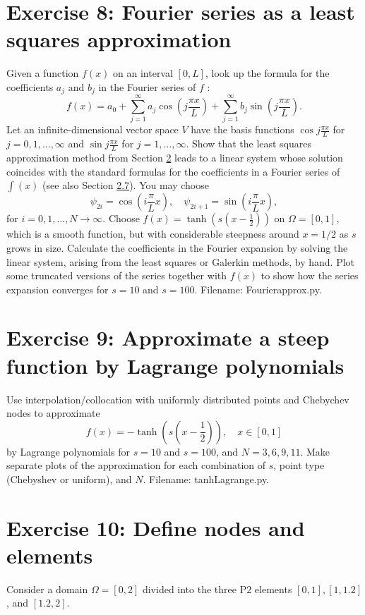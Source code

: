 \documentclass[../main.tex]{subfiles}
\begin{document}
	\section*{Exercise 8: Fourier series as a least squares approximation}
	\label{sec:sec_10_8}
	\noindent Given a function $f(x)$ on an interval $[0, L]$, look up the formula for the coefficients $a_{j}$ and $b_{j}$ in the Fourier series of $f$ :
	$$
	f(x)=a_{0}+\sum_{j=1}^{\infty} a_{j} \cos \left(j \frac{\pi x}{L}\right)+\sum_{j=1}^{\infty} b_{j} \sin \left(j \frac{\pi x}{L}\right).
	$$
	Let an infinite-dimensional vector space $V$ have the basis functions $\cos j \frac{\pi x}{L}$ for $j=0,1, \ldots, \infty$ and $\sin j \frac{\pi x}{L}$ for $j=1, \ldots, \infty$. Show that the least squares approximation method from Section \hyperref[chap:chap_2]{2} leads to a linear system whose solution coincides with the standard formulas for the coefficients in a Fourier series of $\int(x)$ (see also Section \hyperref[sec:sec_2_7]{2.7}). You may choose
	$$
	\psi_{2 i}=\cos \left(i \frac{\pi}{L} x\right), \quad \psi_{2 i+1}=\sin \left(i \frac{\pi}{L} x\right),
	$$
	for $i=0,1, \ldots, N \rightarrow \infty$.
	Choose $f(x)=\tanh \left(s\left(x-\frac{1}{2}\right)\right)$ on $\Omega=[0,1]$, which is a smooth function, but with considerable steepness around $x=1 / 2$ as $s$ grows in size. Calculate the coefficients in the Fourier expansion by solving the linear system, arising from the least squares or Galerkin methods, by hand. Plot some truncated versions of the series together with $f(x)$ to show how the series expansion converges for $s=10$ and $s=100$. Filename: Fourier\textunderscore approx.py.
	\bigbreak
	\section*{Exercise 9: Approximate a steep function by Lagrange polynomials}
	\label{sec:sec_10_9}
	\noindent Use interpolation/collocation with uniformly distributed points and Chebychev nodes to approximate
	$$
	f(x)=-\tanh \left(s\left(x-\frac{1}{2}\right)\right), \quad x \in[0,1]
	$$
	by Lagrange polynomials for $s=10$ and $s=100$, and $N=3,6,9,11$. Make separate plots of the approximation for each combination of $s$, point type (Chebyshev or uniform), and $N$. Filename: tanh\textunderscore Lagrange.py.
	\bigbreak
	\section*{Exercise 10: Define nodes and elements}
	\label{sec:sec_10_10}
	\noindent Consider a domain $\Omega=[0,2]$ divided into the three $\mathrm{P} 2$ elements $[0,1],[1,1.2]$, and $[1.2,2]$.
	
\end{document}

